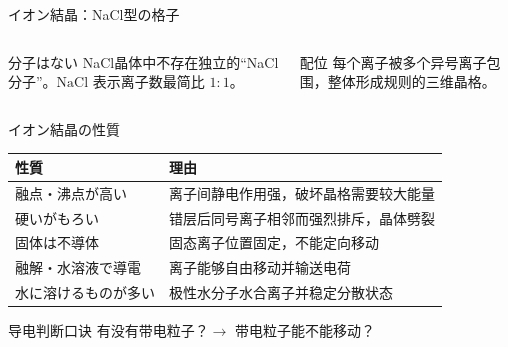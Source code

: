 \documentclass[notheorems,aspectratio=169]{beamer}
\begin{document}
\begin{frame}{イオン結晶：NaCl型の格子}
\begin{columns}[c,onlytextwidth]
\centering
{}
\begin{block}{分子はない}
NaCl晶体中不存在独立的“NaCl分子”。$\mathrm{NaCl}$ 表示离子数最简比 $1:1$。
\end{block}
\begin{exampleblock}{配位}
每个离子被多个异号离子包围，整体形成规则的三维晶格。
\end{exampleblock}
\end{columns}
\end{frame}

\begin{frame}{イオン結晶の性質}
\small
\centering
\begin{tabular}{p{29mm}p{76mm}}\toprule
性質 & 理由\\\midrule
融点・沸点が高い & 离子间静电作用强，破坏晶格需要较大能量\\
硬いがもろい & 错层后同号离子相邻而强烈排斥，晶体劈裂\\
固体は不導体 & 固态离子位置固定，不能定向移动\\
融解・水溶液で導電 & 离子能够自由移动并输送电荷\\
水に溶けるものが多い & 极性水分子水合离子并稳定分散状态\\\bottomrule
\end{tabular}
\vfill
\begin{alertblock}{导电判断口诀}
\centering 有没有带电粒子？$\rightarrow$ 带电粒子能不能移动？
\end{alertblock}
\end{frame}
\end{document}

